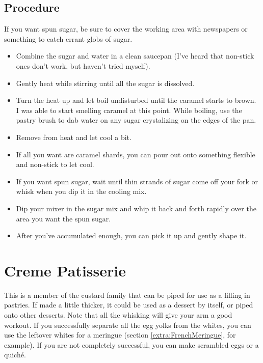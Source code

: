\documentclass[10pt, openany]{book}
\begin{document}
\subsection{Procedure}
If you want spun sugar, be sure to cover the working area with newspapers or something to catch errant globs of sugar.
\begin{itemize}
  \item Combine the sugar and water in a clean saucepan (I've heard that non-stick ones don't work, but haven't tried myself).
  \item Gently heat while stirring until all the sugar is dissolved.
  \item Turn the heat up and let boil undisturbed until the caramel starts to brown.  I was able to start smelling caramel at this point.  While boiling, use the pastry brush to dab water on any sugar crystalizing on the edges of the pan.
  \item Remove from heat and let cool a bit.
  \item If all you want are caramel shards, you can pour out onto something flexible and non-stick to let cool.
  \item If you want spun sugar, wait until thin strands of sugar come off your fork or whisk when you dip it in the cooling mix.
  \item Dip your mixer in the sugar mix and whip it back and forth rapidly over the area you want the spun sugar.
  \item After you've accumulated enough, you can pick it up and gently shape it.
\end{itemize}

\section{Creme Patisserie}
\label{extra:CremePat}
This is a member of the custard family that can be piped for use as a filling in pastries.  If made a little thicker, it could be used as a dessert by itself, or piped onto other desserts.  Note that all the whisking will give your arm a good workout.  If you successfully separate all the egg yolks from the whites, you can use the leftover whites for a meringue (section \ref{extra:FrenchMeringue}, for example).  If you are not completely successful, you can make scrambled eggs or a quich\'e.
\end{document}
